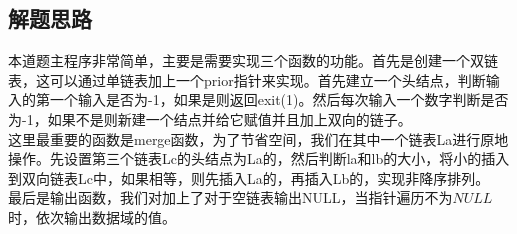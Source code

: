 \documentclass[UTF8]{ctexart}
\begin{document}
	
	
	\subsection{解题思路}
\indent 本道题主程序非常简单，主要是需要实现三个函数的功能。首先是创建一个双链表，这可以通过单链表加上一个prior指针来实现。首先建立一个头结点，判断输入的第一个输入是否为-1，如果是则返回exit(1)。然后每次输入一个数字判断是否为-1，如果不是则新建一个结点并给它赋值并且加上双向的链子。\\
\indent 这里最重要的函数是merge函数，为了节省空间，我们在其中一个链表La进行原地操作。先设置第三个链表Lc的头结点为La的，然后判断la和lb的大小，将小的插入到双向链表Lc中，如果相等，则先插入La的，再插入Lb的，实现非降序排列。\\
\indent 最后是输出函数，我们对加上了对于空链表输出NULL，当指针遍历不为$NULL$时，依次输出数据域的值。
%	
%	
%	
\end{document}
